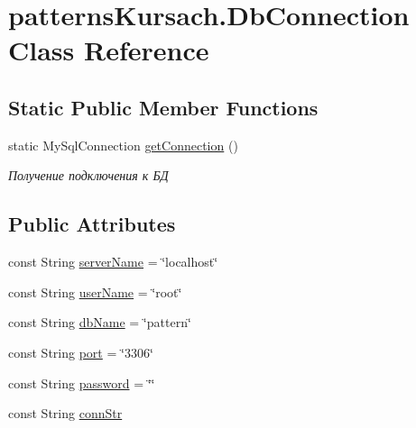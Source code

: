 \hypertarget{classpatterns_kursach_1_1_db_connection}{}\section{patterns\+Kursach.\+Db\+Connection Class Reference}
\label{classpatterns_kursach_1_1_db_connection}
\subsection*{Static Public Member Functions}
\begin{DoxyCompactItemize}
\item 
static My\+Sql\+Connection \mbox{\hyperlink{classpatterns_kursach_1_1_db_connection_a30c5f9ea35c8c1ab85ba540431203590}{get\+Connection}} ()
\begin{DoxyCompactList}\small\item\em Получение подключения к БД \end{DoxyCompactList}\end{DoxyCompactItemize}
\subsection*{Public Attributes}
\begin{DoxyCompactItemize}
\item 
const String \mbox{\hyperlink{classpatterns_kursach_1_1_db_connection_a3d3e6dbf6c6e37527a5a6885fc9f2a3a}{server\+Name}} = \char`\"{}localhost\char`\"{}
\item 
const String \mbox{\hyperlink{classpatterns_kursach_1_1_db_connection_a7d457ab2278b176330c807719ab43b17}{user\+Name}} = \char`\"{}root\char`\"{}
\item 
const String \mbox{\hyperlink{classpatterns_kursach_1_1_db_connection_a004b474e138bf030a0b26677203aa28a}{db\+Name}} = \char`\"{}pattern\char`\"{}
\item 
const String \mbox{\hyperlink{classpatterns_kursach_1_1_db_connection_a320a0f64312ebe973e6bedbd4643ae40}{port}} = \char`\"{}3306\char`\"{}
\item 
const String \mbox{\hyperlink{classpatterns_kursach_1_1_db_connection_af01a81bc636c18072192a923e1f7d4d6}{password}} = \char`\"{}\char`\"{}
\item 
const String \mbox{\hyperlink{classpatterns_kursach_1_1_db_connection_a99322d824eba94a085cf10f971480b9a}{conn\+Str}}
\end{DoxyCompactItemize}


